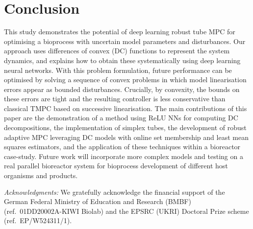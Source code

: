 \documentclass[final,5p,times,twocolumn,authoryear]{elsarticle}
\begin{document}

\section{Conclusion}
This study demonstrates the potential of deep learning robust tube MPC for optimising a bioprocess with uncertain model parameters and disturbances.
%
Our approach uses differences of convex (DC) functions to represent the system dynamics, and explains how to obtain these systematically using deep learning neural networks.
%
With this problem formulation, future performance can be optimised by solving a sequence of convex problems in which model linearisation errors appear as bounded disturbances.
%
Crucially, by convexity, the bounds on these errors are tight and the resulting controller is less conservative than classical TMPC based on successive linearisation.
%
The main contributions of this paper are the demonstration of a method using ReLU NNs for computing DC decompositions, the implementation of simplex tubes, the development of robust adaptive MPC leveraging DC models with online set membership and least mean squares estimators, and the application of these techniques within a bioreactor case-study.
%
Future work will incorporate more complex models and testing on a real parallel bioreactor system for bioprocess development of different host organisms and products.

\baselineskip
\emph{Acknowledgments:} We gratefully acknowledge the financial support of the German Federal Ministry of Education and Research (BMBF) (ref.~01DD20002A-KIWI Biolab) and the EPSRC (UKRI) Doctoral Prize scheme (ref.~EP/W524311/1).
\vspace{-3mm}


\end{document}
